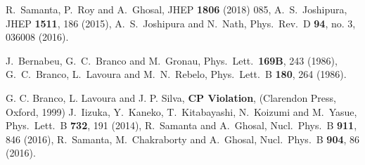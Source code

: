 \documentclass[11pt]{article}
\providecommand{\xlink}[1]
  {\href{http://arxiv.org/abs/#1}{arXiv:#1}}
\begin{document}
\begin{thebibliography}{9}




  R.~Samanta, P.~Roy and A.~Ghosal,
  JHEP {\bf 1806} (2018) 085,
A.~S.~Joshipura,
JHEP {\bf 1511}, 186 (2015),
A.~S.~Joshipura and N.~Nath,
Phys.\ Rev.\ D {\bf 94}, no. 3, 036008 (2016).  
  

  
  
  J.~Bernabeu, G.~C.~Branco and M.~Gronau,
  Phys.\ Lett.\  {\bf 169B}, 243 (1986),
  G.~C.~Branco, L.~Lavoura and M.~N.~Rebelo,
  Phys.\ Lett.\ B {\bf 180}, 264 (1986).
  
   G. C. Branco, L. Lavoura and J. P. Silva, {\bf CP Violation}, (Clarendon Press, Oxford, 1999)
  J.~Iizuka, Y.~Kaneko, T.~Kitabayashi, N.~Koizumi and M.~Yasue,
  Phys.\ Lett.\ B {\bf 732}, 191 (2014),
  R.~Samanta and A.~Ghosal,
  Nucl.\ Phys.\ B {\bf 911}, 846 (2016),
R.~Samanta, M.~Chakraborty and A.~Ghosal,
  Nucl.\ Phys.\ B {\bf 904}, 86 (2016).


\end{thebibliography}
\end{document}

